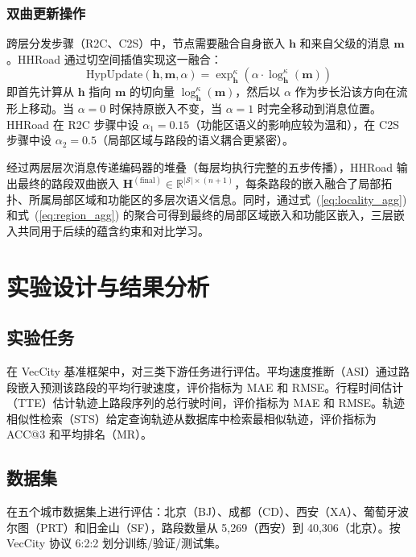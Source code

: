 \subsubsection{双曲更新操作}

跨层分发步骤（R2C、C2S）中，节点需要融合自身嵌入 $\mathbf{h}$ 和来自父级的消息 $\mathbf{m}$。HHRoad 通过切空间插值实现这一融合：
\begin{equation}
    \text{HypUpdate}(\mathbf{h}, \mathbf{m}, \alpha) = \exp_{\mathbf{h}}^\kappa\left(\alpha \cdot \log_{\mathbf{h}}^\kappa(\mathbf{m})\right)
    \label{eq:hyp_update}
\end{equation}
即首先计算从 $\mathbf{h}$ 指向 $\mathbf{m}$ 的切向量 $\log_{\mathbf{h}}^\kappa(\mathbf{m})$，然后以 $\alpha$ 作为步长沿该方向在流形上移动。当 $\alpha=0$ 时保持原嵌入不变，当 $\alpha=1$ 时完全移动到消息位置。HHRoad 在 R2C 步骤中设 $\alpha_1=0.15$（功能区语义的影响应较为温和），在 C2S 步骤中设 $\alpha_2=0.5$（局部区域与路段的语义耦合更紧密）。

经过两层层次消息传递编码器的堆叠（每层均执行完整的五步传播），HHRoad 输出最终的路段双曲嵌入 $\mathbf{H}^{(\text{final})} \in \mathbb{R}^{|\mathcal{S}| \times (n+1)}$，每条路段的嵌入融合了局部拓扑、所属局部区域和功能区的多层次语义信息。同时，通过式~(\ref{eq:locality_agg}) 和式~(\ref{eq:region_agg}) 的聚合可得到最终的局部区域嵌入和功能区嵌入，三层嵌入共同用于后续的蕴含约束和对比学习。

\section{实验设计与结果分析}

\subsection{实验任务}

在 VecCity\cite{zhang2025veccity} 基准框架中，对三类下游任务进行评估。平均速度推断（ASI）通过路段嵌入预测该路段的平均行驶速度，评价指标为 MAE 和 RMSE。行程时间估计（TTE）估计轨迹上路段序列的总行驶时间，评价指标为 MAE 和 RMSE。轨迹相似性检索（STS）给定查询轨迹从数据库中检索最相似轨迹，评价指标为 ACC@3 和平均排名（MR）。

\subsection{数据集}

在五个城市数据集上进行评估：北京（BJ）、成都（CD）、西安（XA）、葡萄牙波尔图（PRT）和旧金山（SF），路段数量从 5,269（西安）到 40,306（北京）。按 VecCity 协议 6:2:2 划分训练/验证/测试集。

